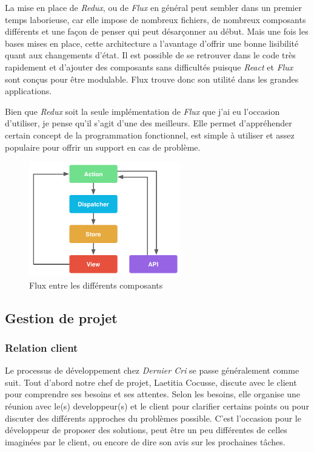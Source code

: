 \bigskip

La mise en place de \emph{Redux}, ou de \emph{Flux} en général peut
sembler dans un premier temps laborieuse, car elle impose de nombreux
fichiers, de nombreux composants différents et une façon de penser qui
peut désarçonner au début. Mais une fois les bases mises en place, cette
architecture a l'avantage d'offrir une bonne lisibilité quant aux
changements d'état. Il est possible de se retrouver dans le code très
rapidement et d'ajouter des composants sans difficultés puisque
\emph{React} et \emph{Flux} sont conçus pour être modulable. Flux trouve
donc son utilité dans les grandes applications.

\bigskip

Bien que \emph{Redux} soit la seule implémentation de \emph{Flux} que
j'ai eu l'occasion d'utiliser, je pense qu'il s'agit d'une des
meilleurs. Elle permet d'appréhender certain concept de la programmation
fonctionnel, est simple à utiliser et assez populaire pour offrir un
support en cas de problème.

\bigskip

\begin{figure}[h]
  \centering
  \includegraphics[height=5cm]{figures/react.png}
  \caption{Flux entre les différents composants}
\end{figure}

\subsection{Gestion de projet}\label{gestion-de-projet}

\subsubsection{Relation client}\label{relation-client}

\bigskip

Le processus de développement chez \emph{Dernier Cri} se passe
généralement comme suit. Tout d'abord notre chef de projet, Laetitia
Cocusse, discute avec le client pour comprendre ses besoins et ses
attentes. Selon les besoins, elle organise une réunion avec le(s)
developpeur(s) et le client pour clarifier certains points ou pour
discuter des différents approches du problèmes possible. C'est
l'occasion pour le développeur de proposer des solutions, peut être un
peu différentes de celles imaginées par le client, ou encore de dire son
avis sur les prochaines tâches.

